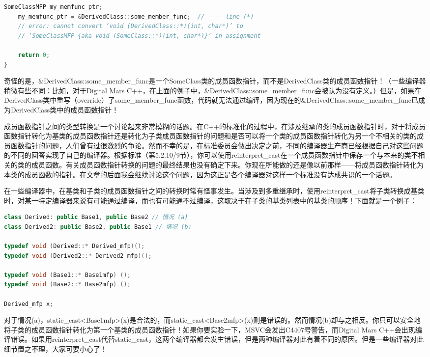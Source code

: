\documentclass{article}
\begin{document}
\begin{CJK}{UTF8}{gbsn}
\begin{lstlisting}[language=c++]
    SomeClassMFP my_memfunc_ptr;
    my_memfunc_ptr = &DerivedClass::some_member_func;  // ---- line (*)
    // error: cannot convert ‘void (DerivedClass::*)(int, char*)’ to
    // ‘SomeClassMFP {aka void (SomeClass::*)(int, char*)}’ in assignment

    return 0;
}
\end{lstlisting}
奇怪的是，\&DerivedClass::some\_member\_func是一个SomeClass类的成员函数指针，而不是DerivedClass类的成员函数指针！（一些编译器稍微有些不同：比如，对于Digital Mars C++，在上面的例子中，\&DerivedClass::some\_member\_func会被认为没有定义。）但是，如果在DerivedClass类中重写（override）了some\_member\_func函数，代码就无法通过编译，因为现在的\&DerivedClass::some\_member\_func已成为DerivedClass类中的成员函数指针！

成员函数指针之间的类型转换是一个讨论起来非常模糊的话题。在C++的标准化的过程中，在涉及继承的类的成员函数指针时，对于将成员函数指针转化为基类的成员函数指针还是转化为子类成员函数指针的问题和是否可以将一个类的成员函数指针转化为另一个不相关的类的成员函数指针的问题，人们曾有过很激烈的争论。然而不幸的是，在标准委员会做出决定之前，不同的编译器生产商已经根据自己对这些问题的不同的回答实现了自己的编译器。根据标准（第5.2.10/9节），你可以使用reinterpret\_cast在一个成员函数指针中保存一个与本来的类不相关的类的成员函数。有关成员函数指针转换的问题的最终结果也没有确定下来。你现在所能做的还是像以前那样——将成员函数指针转化为本类的成员函数的指针。在文章的后面我会继续讨论这个问题，因为这正是各个编译器对这样一个标准没有达成共识的一个话题。

在一些编译器中，在基类和子类的成员函数指针之间的转换时常有怪事发生。当涉及到多重继承时，使用reinterpret\_cast将子类转换成基类时，对某一特定编译器来说有可能通过编译，而也有可能通不过编译，这取决于在子类的基类列表中的基类的顺序！下面就是一个例子：
\begin{lstlisting}[language=c++]
class Derived: public Base1, public Base2 // 情况 (a)
class Derived2: public Base2, public Base1 // 情况 (b)

typedef void (Derived::* Derived_mfp)();
typedef void (Derived2::* Derived2_mfp)();

typedef void (Base1::* Base1mfp) ();
typedef void (Base2::* Base2mfp) ();

Derived_mfp x;
\end{lstlisting}
对于情况(a)，static\_cast<Base1mfp>(x)是合法的，而static\_cast<Base2mfp>(x)则是错误的。然而情况(b)却与之相反。你只可以安全地将子类的成员函数指针转化为第一个基类的成员函数指针！如果你要实验一下，MSVC会发出C4407号警告，而Digital Mars C++会出现编译错误。如果用reinterpret\_cast代替static\_cast，这两个编译器都会发生错误，但是两种编译器对此有着不同的原因。但是一些编译器对此细节置之不理，大家可要小心了！


\end{CJK}
\end{document}
